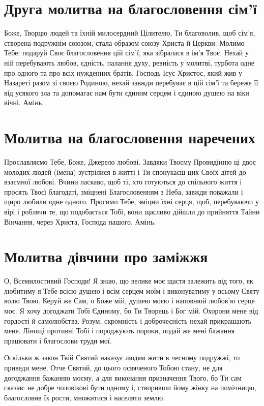 \documentclass[chapters.tex]{subfiles}
\begin{document}
\section{Друга молитва на благословення сім’ї}
Боже, Творцю людей та їхній милосердний Цілителю, Ти благоволив, щоб сім’я, створена подружнім союзом, стала образом союзу Христа й Церкви. Молимо Тебе: подаруй Своє благословення цій сім’ї, яка зібралася в ім’я Твоє. Нехай у ній перебувають любов, єдність, палання духу, ревність у молитві, турбота одне про одного та про всіх нужденних братів. Господь Ісус Христос, який жив у Назареті разом зі своєю Родиною, нехай завжди перебуває в цій сім’ї та береже її від усякого зла та допомагає нам бути єдиним серцем і єдиною душею на віки вічні. Амінь.

\section{Молитва на благословення наречених}
Прославляємо Тебе, Боже, Джерело любові. Завдяки Твоєму Провидінню ці двоє молодих людей (імена) зустрілися в житті і Ти спонукаєш цих Своїх дітей до взаємної любові. Вчини ласкаво, щоб ті, хто готуються до спільного життя і просять Твоєї благодаті, зміцнені Благословенням з Неба, завжди поважали і щиро любили одне одного. Просимо Тебе, зміцни їхні серця, щоб, перебуваючи у вірі і роблячи те, що подобається Тобі, вони щасливо дійшли до прийняття Тайни Вінчання, через Христа, Господа нашого. Амінь.

\section{Молитва дівчини про заміжжя}
О, Всемилостивий Господи! Я знаю, що велике моє щастя залежить від того, як любитиму я Тебе всією душею і всім серцем моїм і виконуватиму у всьому Святу волю Твою. Керуй же Сам, о Боже мій, душею моєю і наповнюй любов’ю серце моє. Я хочу догоджати Тобі Єдиному, бо Ти Творець і Бог мій. Охорони мене від гордості й самолюбства. Розум, скромність і доброчесність нехай прикрашають мене. Лінощі противні Тобі і породжують пороки, подай же мені бажання працювати і благослови труди мої.

Оскільки ж закон Твій Святий наказує людям жити в чесному подружжі, то приведи мене, Отче Святий, до цього освяченого Тобою стану, не для догоджання бажанню моєму, а для виконання призначення Твого, бо Ти сам сказав: не добре чоловікові бути одному і, створивши йому жінку на помічницю, благословив їх рости, множитися і населяти землю.
\end{document}
